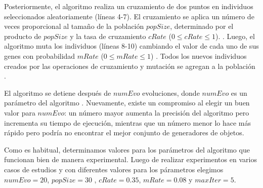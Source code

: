 Posteriormente, el algoritmo realiza un cruzamiento de dos puntos en individuos
seleccionados aleatoriamente (líneas 4-7). 
El cruzamiento se aplica un número de veces proporcional al tamaño de la población $popSize$, 
determinado por el producto de $popSize$ y la tasa de cruzamiento $cRate$ ($0
\leq cRate \leq 1$). . 
Luego, el algoritmo muta los individuos (líneas 8-10) cambiando el valor de cada
uno de sus genes con probabilidad $mRate$ ($0 \leq mRate \leq 1$) . 
Todos los nuevos individuos creados por las operaciones de cruzamiento y
mutación se agregan a la población .

El algoritmo se detiene después de $numEvo$ 
evoluciones, donde $numEvo$ es un parámetro del algoritmo . 
Nuevamente, existe un compromiso al elegir un buen valor para $numEvo$: un número mayor aumenta la precisión del algoritmo pero incrementa su tiempo de ejecución, 
mientras que un número menor lo hace más rápido pero podría no encontrar el
mejor conjunto de generadores de objetos.


Como es habitual, determinamos valores para los parámetros del algoritmo que
funcionan bien de manera experimental. Luego de realizar experimentos en
varios casos de estudios y con diferentes valores para los párametros 
elegimos $numEvo=20$, $popSize=30$ , $cRate=0.35$, $mRate=0.08$ 
y $maxIter=5$. 


